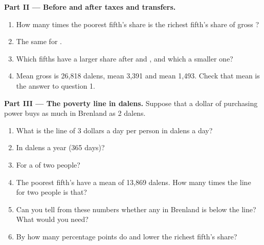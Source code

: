 \begin{problem}
\medskip
\noindent\textbf{Part II --- Before and after taxes and transfers.}
\begin{enumerate}[resume]
  \item How many times the poorest fifth's share is the richest fifth's share of gross ?
  \item The same for .
  \item Which fifths have a larger share after  and , and which a smaller one?
  \item Mean gross  is 26,818 dalens, mean  3,391 and mean  1,493. Check that mean
         is the answer to question 1.
\end{enumerate}

\medskip
\noindent\textbf{Part III --- The poverty line in dalens.} Suppose that a dollar of purchasing power buys as
much in Brenland as 2 dalens.
\begin{enumerate}[resume]
  \item What is the line of 3 dollars a day per person in dalens a day?
  \item In dalens a year (365 days)?
  \item For a  of two people?
  \item The poorest fifth's  have a mean  of 13,869 dalens. How many times the
        line for two people is that?
  \item Can you tell from these numbers whether any  in Brenland is below the line? What would you
        need?
  \item By how many percentage points do  and  lower the richest fifth's share?
\end{enumerate}
\end{problem}
